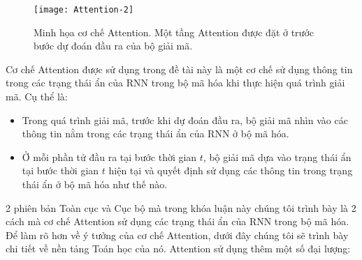 \begin{figure}
	\centering
	\texttt{[image: Attention-2]}
	\caption[Minh họa cơ chế Attention.]{Minh họa cơ chế Attention. Một tầng Attention được đặt ở trước bước dự đoán đầu ra của bộ giải mã.}
	\label{fig_Attention}
\end{figure}
Cơ chế Attention được sử dụng trong đề tài này là một cơ chế sử dụng thông tin trong các trạng thái ẩn của RNN trong bộ mã hóa khi thực hiện quá trình giải mã. Cụ thể là:
\begin{itemize}
	\item Trong quá trình giải mã, trước khi dự đoán đầu ra, bộ giải mã nhìn vào các thông tin nằm trong các trạng thái ẩn của RNN ở bộ mã hóa.
	\item Ở mỗi phần tử đầu ra tại bước thời gian $t$, bộ giải mã dựa vào trạng thái ẩn tại bước thời gian $t$ hiện tại và quyết định sử dụng các thông tin trong trạng thái ẩn ở bộ mã hóa như thế nào.
\end{itemize}
2 phiên bản Toàn cục và Cục bộ mà trong khóa luận này chúng tôi trình bày là 2 cách mà cơ chế Attention sử dụng các trạng thái ẩn của RNN trong bộ mã hóa.
Để làm rõ hơn về ý tưởng của cơ chế Attention, dưới đây chúng tôi sẽ trình bày chi tiết về nền tảng Toán học của nó.
Attention sử dụng thêm một số đại lượng:
